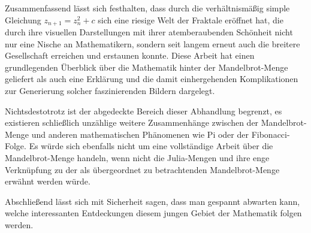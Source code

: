 
Zusammenfassend lässt sich festhalten, dass durch die verhältnismäßig simple
Gleichung $z_{n+1} = z_n^2 + c$ sich eine riesige Welt der Fraktale eröffnet
hat, die durch ihre visuellen Darstellungen mit ihrer atemberaubenden Schönheit
nicht nur eine Nische an Mathematikern, sondern seit langem erneut auch die
breitere Gesellschaft erreichen und erstaunen konnte.
Diese Arbeit hat einen grundlegenden Überblick über die Mathematik hinter der
Mandelbrot-Menge geliefert als auch eine Erklärung und die damit einhergehenden
Komplikationen zur Generierung solcher faszinierenden Bildern dargelegt.

Nichtsdestotrotz ist der abgedeckte Bereich dieser Abhandlung begrenzt, es
existieren schließlich unzählige weitere Zusammenhänge zwischen
der Mandelbrot-Menge und anderen mathematischen Phänomenen wie Pi oder der
Fibonacci-Folge.
Es würde sich ebenfalls nicht um eine vollständige Arbeit über die
Mandelbrot-Menge handeln, wenn nicht die Julia-Mengen und ihre enge Verknüpfung
zu der als übergeordnet zu betrachtenden Mandelbrot-Menge erwähnt werden würde.

Abschließend lässt sich mit Sicherheit sagen, dass man gespannt abwarten kann,
welche interessanten Entdeckungen diesem jungen Gebiet der Mathematik folgen
werden.